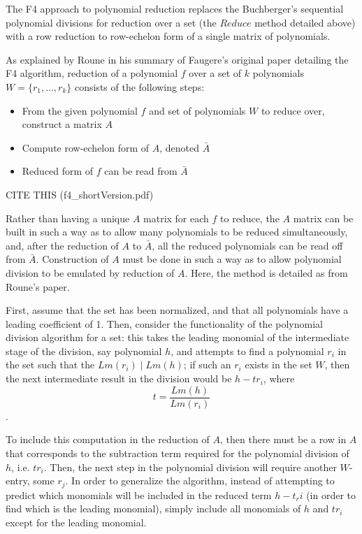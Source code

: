 \documentclass[letterpaper,12pt,titlepage,oneside,final]{book}
\begin{document}
The F4 approach to polynomial reduction replaces the Buchberger's sequential polynomial divisions for reduction over a set (the ${Reduce}$ method detailed above) with a row reduction to row-echelon form of a single matrix of polynomials.

As explained by Roune in his summary of Faugere's original paper detailing the F4 algorithm, reduction of a polynomial ${f}$ over a set of ${k}$ polynomials ${W = \{r_1, \ldots, r_k\}}$ consists of the following steps:
\begin{itemize}
  \item From the given polynomial ${f}$ and set of polynomials ${W}$ to reduce over, construct a matrix ${A}$
  \item Compute row-echelon form of ${A}$, denoted ${\bar A}$
  \item Reduced form of ${f}$ can be read from ${\bar A}$
\end{itemize}      
CITE THIS (f4\_shortVersion.pdf)

Rather than having a unique ${A}$ matrix for each ${f}$ to reduce, the ${A}$ matrix can be built in such a way as to allow many polynomials to be reduced simultaneously, and, after the reduction of ${A}$ to ${\bar A}$, all the reduced polynomials can be read off from ${\bar A}$.  Construction of ${A}$ must be done in such a way as to allow polynomial division to be emulated by reduction of ${A}$.  Here, the method is detailed as from Roune's paper.

First, assume that the set has been normalized, and that all polynomials have a leading coefficient of 1.  Then, consider the functionality of the polynomial division algorithm for a set: this takes the leading monomial of the intermediate stage of the division, say polynomial ${h}$, and attempts to find a polynomial ${r_i}$ in the set such that the ${Lm(r_i) \mid Lm(h)}$; if such an ${r_i}$ exists in the set ${W}$, then the next intermediate result in the division would be ${h - tr_i}$, where $${t = \frac{Lm(h)}{Lm(r_i)}}$$.  

To include this computation in the reduction of ${A}$, then there must be a row in ${A}$ that corresponds to the subtraction term required for the polynomial division of ${h}$, i.e. ${tr_i}$.  Then, the next step in the polynomial division will require another ${W}$-entry, some ${r_j}$.  In order to generalize the algorithm, instead of attempting to predict which monomials will be included in the reduced term ${h - t_ri}$ (in order to find which is the leading monomial), simply include all monomials of ${h}$ and ${tr_i}$ except for the leading monomial.
\end{document}
